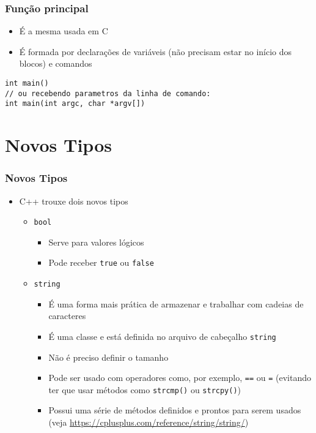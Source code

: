 \documentclass[aspectratio=169]{beamer}
\begin{document}
\begin{frame}[fragile]\frametitle{Função principal}
\begin{itemize}
	\item É a mesma usada em C
	\item É formada por declarações de variáveis (não precisam estar no início dos blocos) e comandos
\end{itemize}
\begin{lstlisting}
int main()
// ou recebendo parametros da linha de comando:
int main(int argc, char *argv[])
\end{lstlisting}
\end{frame}

\section{Novos Tipos}

\begin{frame}[fragile]\frametitle{Novos Tipos}
\begin{itemize}
	\item C++ trouxe dois novos tipos
	\begin{itemize}
		\item \texttt{bool}
		\begin{itemize}
			\item Serve para valores lógicos
			\item Pode receber \texttt{true} ou \texttt{false}
		\end{itemize}
		\item \texttt{string}
		\begin{itemize}
			\item É uma forma mais prática de armazenar e trabalhar com cadeias de caracteres
			\item É uma classe e está definida no arquivo de cabeçalho \texttt{string}
			\item Não é preciso definir o tamanho
			\item Pode ser usado com operadores como, por exemplo, \texttt{==} ou \texttt{=} (evitando ter que usar métodos como \texttt{strcmp()} ou \texttt{strcpy()})
			\item Possui uma série de métodos definidos e prontos para serem usados (veja \url{https://cplusplus.com/reference/string/string/})
		\end{itemize}
	\end{itemize}
\end{itemize}
\end{frame}
\end{document}
